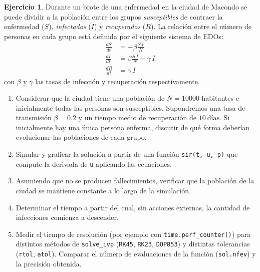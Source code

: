 \documentclass[12pt, a4paper]{amsbook}
\theoremstyle{remark}
\theoremstyle{definition}
\newtheorem{ejer}[teo]{Ejercicio}
\numberwithin{section}{chapter}
\numberwithin{subsection}{section}
\numberwithin{equation}{section}
\numberwithin{figure}{chapter}
\begin{document}
\begin{ejer}\label{modelo-SIR}
Durante un brote de una enfermedad en la ciudad de Macondo se puede dividir a la población entre los grupos \emph{susceptibles} de contraer la enfermedad ($S$), \emph{infectados} ($I$) y \emph{recuperados} ($R$). La relación entre el número de personas en cada grupo está definida por el siguiente sistema de EDOs:
\begin{align*}
    \frac{dS}{dt} &= -\beta \frac{S\,I}{N}\\
    \frac{dI}{dt} &= \beta \frac{S\,I}{N} - \gamma\, I\\
    \frac{dR}{dt} &= \gamma\, I
\end{align*}  
\noindent con $\beta$ y $\gamma$ las tasas de infección y recuperación respectivamente.
\begin{enumerate}
    \item Considerar que la ciudad tiene una población de $N = 10000$ habitantes e inicialmente todas las personas son susceptibles. Supondremos una tasa de transmisión $\beta=0.2$ y un tiempo medio de recuperación de $10~\text{días}$. Si inicialmente hay una única persona enferma, discutir de qué forma deberían evolucionar las poblaciones de cada grupo. 
    \item Simular y graficar la solución a partir de una función \lstinline{sir(t, u, p)} que compute la derivada de \lstinline{u} aplicando las ecuaciones. 
    \item Asumiendo que no se producen fallecimientos, verificar que la población de la ciudad se mantiene constante a lo largo de la simulación.
    \item Determinar el tiempo a partir del cual, sin acciones externas, la cantidad de infecciones comienza a descender.
    \item Medir el tiempo de resolución (por ejemplo con \lstinline{time.perf_counter()}) para distintos métodos de \lstinline{solve_ivp} (\lstinline{RK45}, \lstinline{RK23}, \lstinline{DOP853}) y distintas tolerancias (\lstinline{rtol}, \lstinline{atol}). Comparar el número de evaluaciones de la función (\lstinline{sol.nfev}) y la precisión obtenida.
\end{enumerate}
\end{ejer}
\end{document}
